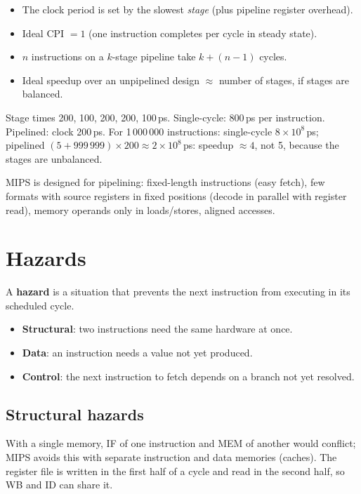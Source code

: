 \begin{itemize}
  \item The clock period is set by the slowest \emph{stage} (plus pipeline
    register overhead).
  \item Ideal CPI $= 1$ (one instruction completes per cycle in steady state).
  \item $n$ instructions on a $k$-stage pipeline take $k + (n-1)$ cycles.
  \item Ideal speedup over an unpipelined design $\approx$ number of stages,
    if stages are balanced.
\end{itemize}

\begin{example}
Stage times 200, 100, 200, 200, 100\,ps. Single-cycle: 800\,ps per
instruction. Pipelined: clock 200\,ps. For 1\,000\,000 instructions:
single-cycle $8 \times 10^8$\,ps; pipelined $(5 + 999\,999) \times 200
\approx 2 \times 10^8$\,ps: speedup $\approx 4$, not 5, because the stages
are unbalanced.
\end{example}

MIPS is designed for pipelining: fixed-length instructions (easy fetch),
few formats with source registers in fixed positions (decode in parallel
with register read), memory operands only in loads/stores, aligned accesses.

\section{Hazards}

\begin{definition}
A \textbf{hazard} is a situation that prevents the next instruction from
executing in its scheduled cycle.
\begin{itemize}
  \item \textbf{Structural}: two instructions need the same hardware at once.
  \item \textbf{Data}: an instruction needs a value not yet produced.
  \item \textbf{Control}: the next instruction to fetch depends on a branch
    not yet resolved.
\end{itemize}
\end{definition}

\subsection{Structural hazards}

With a single memory, IF of one instruction and MEM of another would
conflict; MIPS avoids this with separate instruction and data memories
(caches). The register file is written in the first half of a cycle and
read in the second half, so WB and ID can share it.

